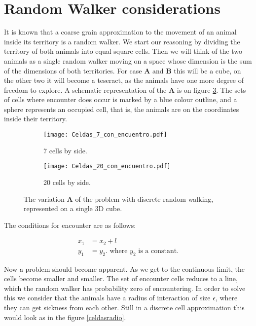 \documentclass[letterpaperr,12pt]{article}
\newcommand{\Acase}{\textbf{A}\xspace}
\newcommand{\Bcase}{\textbf{B}\xspace}
\begin{document}
\section{Random Walker considerations}

It is known that a coarse grain approximation to the movement of an 
animal inside its territory is a random walker. We start
our reasoning by dividing the territory of both animals into equal 
square cells. Then we will think of the two animals as a single
random walker moving on a space whose dimension is the sum of 
the dimensions of both territories. 
For case \Acase and \Bcase this will be a cube, on the other
two it will become a teseract, as the animals have one more
degree of freedom to explore. A schematic representation
of the \Acase is on figure \ref{CeldasA}. The sets of cells
where encounter does occur is marked by a blue colour outline,
and a sphere represents an occupied cell, that is, the
animals are on the coordinates inside their territory.

\begin{figure}[h]
  \centering
  \begin{subfigure}[b]{0.49\textwidth}
    \centering
    \texttt{[image: Celdas\_7\_con\_encuentro.pdf]}
    \caption{7 cells by side.}
    \label{gruesaceldas}
  \end{subfigure}
  \begin{subfigure}[b]{0.49\textwidth}
    \centering
    \texttt{[image: Celdas\_20\_con\_encuentro.pdf]}
    \caption{20 cells by side.}
    \label{finaceldas}
  \end{subfigure}
  \caption{The variation \Acase of the problem with 
    discrete random walking, represented on a single
    3D cube.}\label{CeldasA}
\end{figure}

The conditions for encounter are as follows:

\begin{align}
x_1&=x_2+l\\
y_1&=y_2. \text{ where  $y_2$ is a constant.}
\end{align}

Now a problem should become apparent. As we get to the
continuous limit, the cells become smaller and smaller.
The set of encounter cells reduces to a line, which the
random walker has probability zero of encountering.
In order to solve this we consider that the animals
have a radius of interaction of size $\epsilon$, where
they can get sickness from each other. Still in a discrete
cell approximation this would look as in the figure \ref{celdasradio}.
\end{document}
